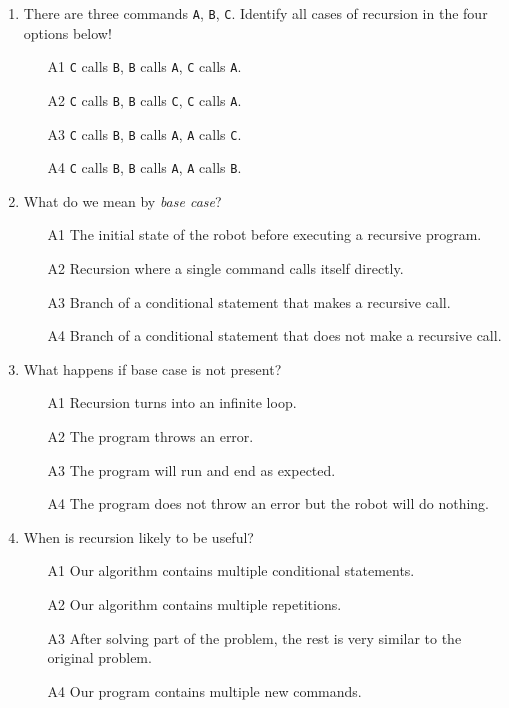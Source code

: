 \documentclass[article,A4,12pt]{llncs}
\begin{document}
{{{{\begin{enumerate}
\item There are three commands {\tt A}, {\tt B}, {\tt C}. Identify all cases of recursion in the four options below!
\begin{enumerate}
\item[A1] {\tt C} calls {\tt B}, {\tt B} calls {\tt A}, {\tt C} calls {\tt A}.
\item[A2] {\tt C} calls {\tt B}, {\tt B} calls {\tt C}, {\tt C} calls {\tt A}.
\item[A3] {\tt C} calls {\tt B}, {\tt B} calls {\tt A}, {\tt A} calls {\tt C}.
\item[A4] {\tt C} calls {\tt B}, {\tt B} calls {\tt A}, {\tt A} calls {\tt B}.
\end{enumerate}
\item What do we mean by {\em base case}?
\begin{enumerate}
\item[A1] The initial state of the robot before executing a recursive program.
\item[A2] Recursion where a single command calls itself directly.
\item[A3] Branch of a conditional statement that makes a recursive call.
\item[A4] Branch of a conditional statement that does not make a recursive call.
\end{enumerate}
\item What happens if base case is not present?
\begin{enumerate}
\item[A1] Recursion turns into an infinite loop.
\item[A2] The program throws an error.
\item[A3] The program will run and end as expected.
\item[A4] The program does not throw an error but the robot will do nothing.
\end{enumerate}
\item When is recursion likely to be useful?
\begin{enumerate}
\item[A1] Our algorithm contains multiple conditional statements.
\item[A2] Our algorithm contains multiple repetitions.
\item[A3] After solving part of the problem, the rest is very similar to the original problem.
\item[A4] Our program contains multiple new commands.

\end{enumerate}
\end{enumerate}}}}}
\end{document}
